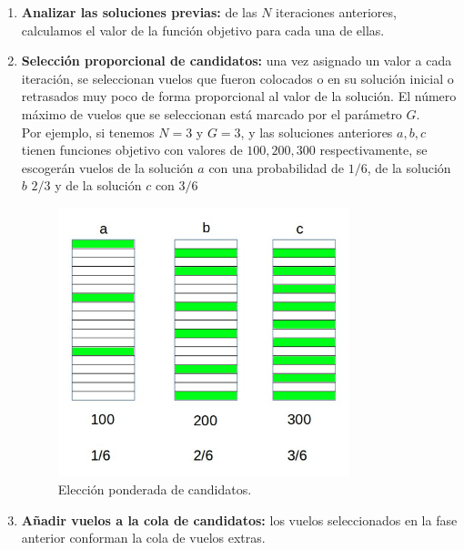 \begin{enumerate}
	\item \textbf{Analizar las soluciones previas:} de las $N$ iteraciones anteriores, calculamos el valor de la función objetivo para cada una de ellas.
	
	\item \textbf{Selección proporcional de candidatos:} una vez asignado un valor a cada iteración, se seleccionan vuelos que fueron colocados o en su solución inicial o retrasados muy poco de forma proporcional al valor de la solución. El número máximo de vuelos que se seleccionan está marcado por el parámetro $G$.\\
	
	Por ejemplo, si tenemos $N=3$ y $G=3$, y las soluciones anteriores $a,b,c$ tienen funciones objetivo con valores de $100,200,300$ respectivamente, se escogerán vuelos de la solución $a$ con una probabilidad de $1/6$, de la solución $b$ $2/3$ y de la solución $c$ con $3/6$
	\begin{figure}[H]
		\begin{center}
			\centering
			\includegraphics[width=0.8\textwidth]{./imagenes/heuristico/valorSoluciones.jpg}
			\caption{Elección ponderada de candidatos.}
			\label{fig: Elección ponderada de candidatos}
		\end{center}
	\end{figure}
	
	\item \textbf{Añadir vuelos a la cola de candidatos:} los vuelos seleccionados  en la fase anterior conforman la cola de vuelos extras.
	

\end{enumerate}
